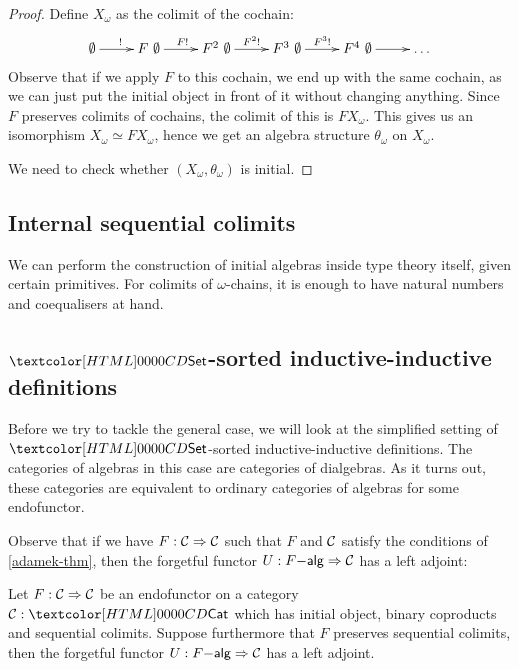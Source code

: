 \begin{proof}
  Define $X_\omega$ as the colimit of the cochain:
  $$
  \xymatrix{
    \initobj \ar[r]^{\inithom} 
    &F\ \initobj \ar[r]^{F \inithom} 
    &F^2\ \initobj \ar[r]^{F^2 \inithom} 
    &F^3\ \initobj \ar[r]^{F^3 \inithom} 
    &F^4\ \initobj \ar[r] 
    &\hdots
  }
  $$
  Observe that if we apply $F$ to this cochain, we end up with the
  same cochain, as we can just put the initial object in front of it
  without changing anything. Since $F$ preserves colimits of cochains,
  the colimit of this is $F X_\omega$. This gives us an isomorphism
  $X_\omega \simeq F X_\omega$, hence we get an algebra structure
  $\theta_\omega$ on $X_\omega$.

  We need to check whether $(X_\omega,\theta_\omega)$ is initial.
\end{proof}

\subsection{Internal sequential colimits}

We can perform the construction of initial algebras inside type theory
itself, given certain primitives. For colimits of $\omega$-chains, it
is enough to have natural numbers and coequalisers at hand.


\subsection{$\Set$-sorted inductive-inductive definitions}

Before we try to tackle the general case, we will look at the
simplified setting of $\Set$-sorted inductive-inductive
definitions. The categories of algebras in this case are categories of
dialgebras. As it turns out, these categories are equivalent to
ordinary categories of algebras for some endofunctor.

Observe that if we have $F : \mathcal{C} \Rightarrow \mathcal{C}$ such that $F$ and $\mathcal{C}$
satisfy the conditions of \cref{adamek-thm}, then the forgetful
functor $U : F\mathsf{-alg} \Rightarrow \mathcal{C}$ has a left adjoint:

\begin{proposition}
  Let $F : \mathcal{C} \Rightarrow \mathcal{C}$ be an endofunctor on a category
  $\Cc : \Cat$ which has initial object, binary coproducts and
  sequential colimits. Suppose furthermore that $F$ preserves
  sequential colimits, then the forgetful functor
  $U : F\mathsf{-alg} \Rightarrow \mathcal{C}$ has a left adjoint.
\end{proposition}

